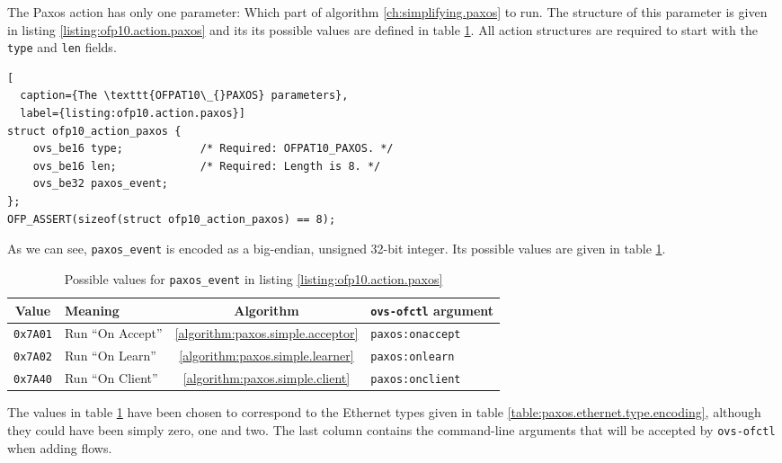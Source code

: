 The Paxos action has only one parameter: Which part of algorithm
\ref{ch:simplifying.paxos} to run.  The structure of this parameter is given
in listing \ref{listing:ofp10.action.paxos} and its its possible values are
defined in table \ref{table:paxos.event.codes}.
%
All action structures are required to start with the \texttt{type} and
\texttt{len} fields.

\begin{lstlisting}[
  caption={The \texttt{OFPAT10\_{}PAXOS} parameters},
  label={listing:ofp10.action.paxos}]
struct ofp10_action_paxos {
    ovs_be16 type;            /* Required: OFPAT10_PAXOS. */
    ovs_be16 len;             /* Required: Length is 8. */
    ovs_be32 paxos_event;
};
OFP_ASSERT(sizeof(struct ofp10_action_paxos) == 8);
\end{lstlisting}

As we can see, \texttt{paxos\_{}event} is encoded as a big-endian, unsigned
32-bit integer.
%
Its possible values are given in table \ref{table:paxos.event.codes}.

\begin{table}[H]
  \centering
  \begin{tabular}{|c|l|c|l|}
    \hline
      \textbf{Value} &
      \textbf{Meaning} &
      \textbf{Algorithm} &
      \textbf{\texttt{ovs-ofctl} argument}
      \\

    \hline
      \texttt{0x7A01} &
      Run ``On Accept'' &
      \ref{algorithm:paxos.simple.acceptor} &
      \texttt{paxos:onaccept}
      \\

    \hline
      \texttt{0x7A02} &
      Run ``On Learn'' &
      \ref{algorithm:paxos.simple.learner} &
      \texttt{paxos:onlearn}
      \\

    \hline
      \texttt{0x7A40} &
      Run ``On Client'' &
      \ref{algorithm:paxos.simple.client} &
      \texttt{paxos:onclient}
      \\

    \hline
  \end{tabular}
  \caption{Possible values for \texttt{paxos\_{}event} in listing
           \ref{listing:ofp10.action.paxos}}
  \label{table:paxos.event.codes}
\end{table}

The values in table \ref{table:paxos.event.codes} have been chosen
to correspond to the Ethernet types given
in table \vref{table:paxos.ethernet.type.encoding}, although they
could have been simply zero, one and two.
%
The last column contains the command-line arguments that will be
accepted by \texttt{ovs-ofctl} when adding flows.

